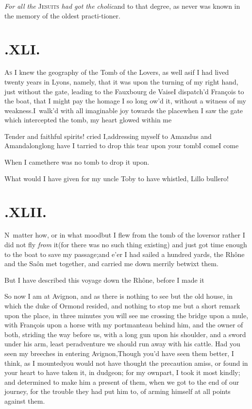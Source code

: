 \documentclass{article}
\begin{document}
\newpage
\textit{For all the} \textsc{Jesuits} \textit{had got the
cholic}\break\tsk and to that degree, as never was known in the
memory of the oldest practi-\break tioner.

\section{.\enspace XLI.}

\lettrine{A}{\!s} I knew the geography of the Tomb of the
Lovers, as well as\break if I had lived twenty years in Lyons, namely,
that it was upon the turning of my right hand, just without the
gate, leading to the Fauxbourg de Vaise\tsk I dispatch’d
François to the boat, that I might pay the homage I so long ow’d
it, without a witness of my weakness.\tsk I~walk’d with all
imaginable joy towards the place\tsk when I saw the gate which
intercepted the tomb, my heart glowed\break
within me\tsh

\newpage
\tsk Tender and faithful spirits! cried I,\break addressing myself
to Amandus and Amanda\tsk long\tsk long have I
tarried to drop this tear upon your tomb\tsh I
come\tsh I come\tsh

When I came\tsk there was no tomb to drop it upon.

What would I have given for my uncle Toby to have
whistled, Lillo bullero!

\section{.\enspace XLII.}

\lettrine{N}{\,} matter how, or in what
mood\tsk\break but I flew from the tomb of the lovers\tsk or rather I
did not fly \textit{from} it\tsk (for there was no such thing
existing) and just got time enough to the boat to save my
passage;\tsk and e’er I had sailed a hundred yards, the
Rhône and the Saôn met together, and
carried me down merrily betwixt them.

\newpage
But I have described this voyage down the Rhône,
before I made it\tsh

\tsh So now I am at Avignon, and as there is
nothing to see but the old house, in which the duke of
Ormond resided, and nothing to stop me but a short remark
upon the place, in three minutes you will see me crossing the
bridge upon a mule, with François upon a horse with
my portmanteau behind him, and the owner of both, striding the way
before us, with a long gun upon his shoulder, and a sword under his
arm, least peradventure we should run away with his cattle. Had you
seen my breeches in entering Avignon,\tsh Though
you’d have seen them better, I think, as I mounted\tsk you
would not have thought the precaution amiss, or found in your heart
to have taken it, in dudgeon; for my own\pb part, I took it most
kindly; and determined to make him a present of them, when we got
to the end of our journey, for the trouble they had put him to, of
arming himself at all points against them.
\end{document}
